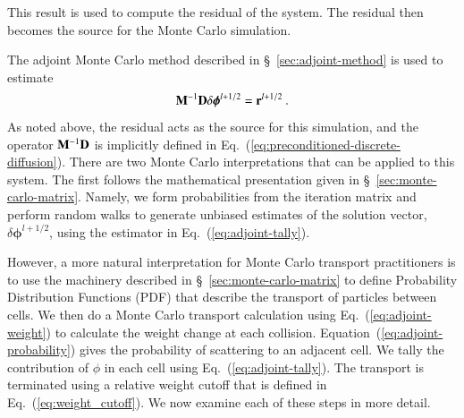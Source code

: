 \documentclass[preprint,12pt]{elsarticle}
\newcommand{\vr}{\ensuremath{\ve{r}}}
\newcommand{\bphi}{\ensuremath{\boldsymbol{\phi}}}
\begin{document}
This result is used to compute the residual of the system.  The
residual then becomes the source for the Monte Carlo simulation.

The adjoint Monte Carlo method described in
\S~\ref{sec:adjoint-method} is used to estimate
\begin{equation}
  \ve{M}^{-1}\ve{D}\delta\bphi^{l+1/2} = \vr^{l+1/2}\:.
\end{equation}
As noted above, the residual acts as the source for this simulation,
and the operator $\mathbf{M}^{-1}\mathbf{D}$ is implicitly defined in
Eq.~(\ref{eq:preconditioned-discrete-diffusion}).  There are two Monte
Carlo interpretations that can be applied to this system.  The first
follows the mathematical presentation given in
\S~\ref{sec:monte-carlo-matrix}.  Namely, we form probabilities from
the iteration matrix and perform random walks to generate unbiased
estimates of the solution vector, $\delta\bphi^{l+1/2}$, using the
estimator in Eq.~(\ref{eq:adjoint-tally}).

However, a more natural interpretation for Monte Carlo transport
practitioners is to use the machinery described in
\S~\ref{sec:monte-carlo-matrix} to define Probability Distribution
Functions (PDF) that describe the transport of particles between
cells.  We then do a Monte Carlo transport calculation using
Eq.~(\ref{eq:adjoint-weight}) to calculate the weight change at each
collision. Equation~(\ref{eq:adjoint-probability}) gives the
probability of scattering to an adjacent cell. We tally the
contribution of $\phi$ in each cell using
Eq.~(\ref{eq:adjoint-tally}).  The transport is terminated using a
relative weight cutoff that is defined in
Eq.~(\ref{eq:weight_cutoff}).  We now examine each of these steps in
more detail.
\end{document}
